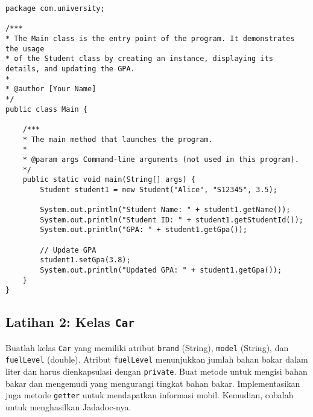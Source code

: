 \begin{lstlisting}[style=JavaStyle, caption={Kode Java: Main.java}]
package com.university;

/***
* The Main class is the entry point of the program. It demonstrates the usage
* of the Student class by creating an instance, displaying its details, and updating the GPA.
* 
* @author [Your Name]
*/
public class Main {
	
	/***
	* The main method that launches the program.
	* 
	* @param args Command-line arguments (not used in this program).
	*/
	public static void main(String[] args) {
		Student student1 = new Student("Alice", "S12345", 3.5);
		
		System.out.println("Student Name: " + student1.getName());
		System.out.println("Student ID: " + student1.getStudentId());
		System.out.println("GPA: " + student1.getGpa());
		
		// Update GPA
		student1.setGpa(3.8);
		System.out.println("Updated GPA: " + student1.getGpa());
	}
}
\end{lstlisting}


\subsection{Latihan 2: Kelas \texttt{Car}}

Buatlah kelas \texttt{Car} yang memiliki atribut \texttt{brand} (String), \texttt{model} (String), dan \texttt{fuelLevel} (double). Atribut \texttt{fuelLevel} menunjukkan jumlah bahan bakar dalam liter dan harus dienkapsulasi dengan \texttt{private}. Buat metode untuk mengisi bahan bakar dan mengemudi yang mengurangi tingkat bahan bakar. Implementasikan juga metode \texttt{getter} untuk mendapatkan informasi mobil. Kemudian, cobalah untuk menghasilkan Jadadoc-nya.


